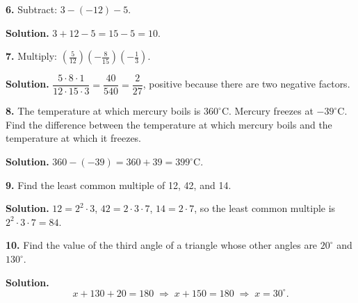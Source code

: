 \documentclass{ximera}
\begin{document}
\begin{problem}

\textbf{6.} Subtract: $3-(-12)-5$.

\begin{hint}
\textbf{Solution.} $3+12-5=15-5=10$.
\end{hint}
\end{problem}

\begin{problem}

\textbf{7.} Multiply: $\left(\frac{5}{12}\right)\left(-\frac{8}{15}\right)\left(-\frac{1}{3}\right)$.

\begin{hint}
\textbf{Solution.} $\dfrac{5\cdot 8\cdot 1}{12\cdot 15\cdot 3}=\dfrac{40}{540}=\dfrac{2}{27}$,
positive because there are two negative factors.
\end{hint}
\end{problem}

\begin{problem}

\textbf{8.} The temperature at which mercury boils is $360^{\circ}\mathrm{C}$. Mercury
freezes at $-39^{\circ}\mathrm{C}$. Find the difference between the temperature at which
mercury boils and the temperature at which it freezes.

\begin{hint}
\textbf{Solution.} $360-(-39)=360+39=399^{\circ}\mathrm{C}$.
\end{hint}
\end{problem}

\begin{problem}

\textbf{9.} Find the least common multiple of 12, 42, and 14.

\begin{hint}
\textbf{Solution.} $12=2^{2}\cdot 3$, $42=2\cdot 3\cdot 7$, $14=2\cdot 7$, so the least
common multiple is $2^{2}\cdot 3\cdot 7=84$.
\end{hint}
\end{problem}

\begin{problem}

\textbf{10.} Find the value of the third angle of a triangle whose other angles are
$20^{\circ}$ and $130^{\circ}$.

\begin{hint}
\textbf{Solution.}
\[
  x+130+20=180 \;\Longrightarrow\; x+150=180 \;\Longrightarrow\; x=30^{\circ}.
\]
\end{hint}
\end{problem}
\end{document}

